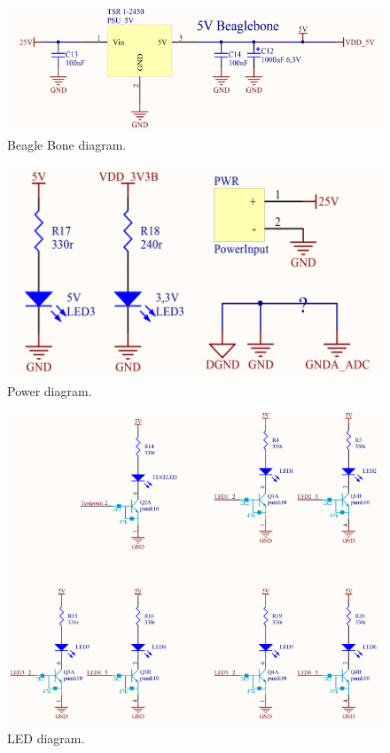 \begin{figure}[H]
	\centering
	\includegraphics[scale=0.92]{figures/BeagleBone.pdf}
	\caption{Beagle Bone diagram.}
	\label{labBeagleBone}
\end{figure}\vspace{-5mm}


\begin{figure}[H]
	\centering
	\includegraphics[scale=0.92]{figures/Power.pdf}
	\caption{Power diagram.}
	\label{labPower}
\end{figure}\vspace{-5mm}


\begin{figure}[H]
	\centering
	\includegraphics[scale=0.92]{figures/Led.pdf}
	\caption{LED diagram.}
	\label{labLed}
\end{figure}\vspace{-5mm}


